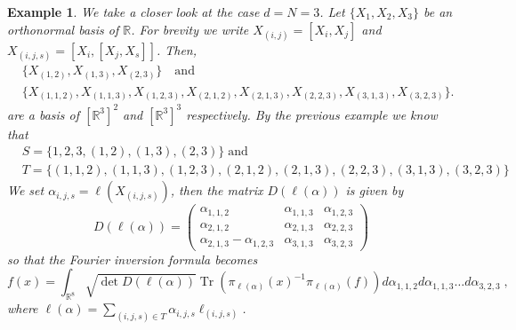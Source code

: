 \documentclass[pdflatex,sn-mathphys-num]{sn-jnl}
\theoremstyle{thmstyletwo}
\theoremstyle{thmstyleone}
\theoremstyle{thmstyletwo}
\newtheorem{example}[definition]{Example}
\begin{document}
		\begin{example}
			We take a closer look at the case $d = N = 3$. Let $\{X_1, X_2, X_3\}$ be an orthonormal basis of $\mathbb{R}$. For brevity we write $X_{(i,j)} = [X_i,X_j]$ and $X_{(i,j,s)} = [X_i,[X_j,X_s]]$. Then,
			\begin{align*}
				&\{X_{(1,2)}, X_{(1,3)}, X_{(2,3)}\} \quad \text{and}\\
				&\{X_{(1,1,2)}, X_{(1,1,3)}, X_{(1,2,3)}, X_{(2,1,2)}, X_{(2,1,3)}, X_{(2,2,3)}, X_{(3,1,3)}, X_{(3,2,3)}\}.
			\end{align*}
			are a basis of $ [\mathbb{R}^3]^2$ and $ [\mathbb{R}^3]^3$ respectively.
			By the previous example we know that
			\begin{align*}
				&S = \{1,2,3, (1,2), (1,3),(2,3)\} \; \text{and}\\
				& T = \{(1,1,2), (1,1,3),(1,2,3),(2,1,2),(2,1,3),(2,2,3),(3,1,3),(3,2,3)\} 
			\end{align*}	
			We set $\alpha_{i,j,s} = \ell(X_{(i,j,s)})$, then the matrix $D(\ell(\alpha))$ is given by 
			\[D(\ell(\alpha))=
			\begin{pmatrix}
				\alpha_{1,1,2} & \alpha_{1,1,3} & \alpha_{1,2,3} \\
				\alpha_{2,1,2} & \alpha_{2,1,3} & \alpha_{2,2,3} \\
				\alpha_{2,1,3}-\alpha_{1,2,3} & \alpha_{3,1,3} & \alpha_{3,2,3}
			\end{pmatrix}\]
			so that the Fourier inversion formula becomes
			\[f(x) = \int_{\mathbb{R}^{8}}\sqrt{\operatorname{det}D(\ell(\alpha))}\operatorname{Tr}\left( \pi_{\ell(\alpha)}(x)^{-1}\pi_{\ell(\alpha)}(f)\right)d\alpha_{1,1,2} d\alpha_{1,1,3}\ldots d\alpha_{3,2,3}\;,\]
			where $\ell(\alpha) = \sum_{(i,j,s) \in T}\alpha_{i,j,s}\ell_{(i,j,s)}$.
		\end{example}
		
\end{document}
